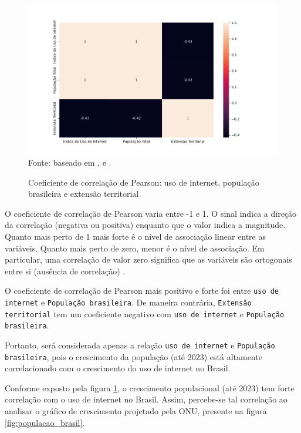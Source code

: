 \begin{figure}[H]
    \centering
    \caption{Coeficiente de correlação de Pearson: uso de internet, população brasileira e extensão territorial}
    \includegraphics[width=1\linewidth]{figuras/internet/correlacao.png}
    \label{fig:internet_correlacao}
    \footnotesize{Fonte: baseado em \cite{ONU_populacao_paises}, \cite{pnda_continua_anual_2016_2023} e \cite{ONU_tamanho_paises}.}
\end{figure}

O coeficiente de correlação de Pearson varia entre -1 e 1. O sinal indica a direção da correlação (negativa ou positiva) enquanto que o valor indica a magnitude. Quanto mais perto de 1 mais forte é o nível de associação linear entre as variáveis. Quanto mais perto de zero, menor é o nível de associação. Em particular, uma correlação de valor zero significa que as variáveis são ortogonais entre si (ausência de
correlação) \cite{sousa2019coeficiente}.

O coeficiente de correlação de Pearson mais positivo e forte foi entre \texttt{uso de internet} e \texttt{População brasileira}. De maneira contrária, \texttt{Extensão territorial} tem um coeficiente negativo com \texttt{uso de internet} e \texttt{População brasileira}. 

Portanto, será considerada apenas a relação \texttt{uso de internet} e \texttt{População brasileira}, pois o crescimento da população (até 2023) está altamente correlacionado com o crescimento do uso de internet no Brasil.

Conforme exposto pela figura \ref{fig:internet_correlacao}, o crescimento populacional (até 2023) tem forte correlação com o uso de internet no Brasil. Assim, percebe-se tal correlação ao analisar o gráfico de crescimento projetado pela ONU, presente na figura \ref{fig:populacao_brasil}.

